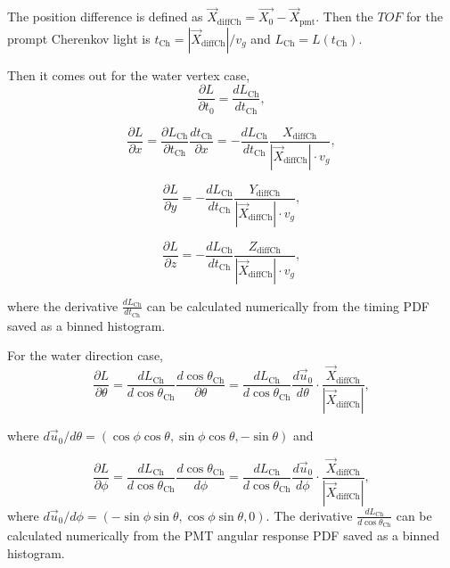 The position difference is defined as $\vec{X}_{{\mathrm{diffCh}}} = \vec{X_0}-\vec{X}_{\mathrm{pmt}}$. Then the $TOF$ for the prompt Cherenkov light is $t_{\mathrm{Ch}}=|\vec{X}_{{\mathrm{diffCh}}}|/v_g$ and $L_{\mathrm{Ch}}=L(t_{\mathrm{Ch}})$.

Then it comes out for the water vertex case,
\begin{equation}
\frac{\partial L}{\partial t_0}=\frac{dL_{\mathrm{Ch}}}{dt_{\mathrm{Ch}}},
\end{equation}

\begin{equation}
\frac{\partial L}{\partial x}=\frac{\partial L_{\mathrm{Ch}}}{\partial t_{\mathrm{Ch}}}\frac{dt_{\mathrm{Ch}}}{\partial x}=-\frac{dL_{\mathrm{Ch}}}{dt_{\mathrm{Ch}}}\frac{X_{{\mathrm{diffCh}}}}{|\vec{X}_{{\mathrm{diffCh}}}|\cdot v_g},
\end{equation}

\begin{equation}
\frac{\partial L}{\partial y}=-\frac{dL_{\mathrm{Ch}}}{dt_{\mathrm{Ch}}}\frac{Y_{{\mathrm{diffCh}}}}{|\vec{X}_{{\mathrm{diffCh}}}|\cdot v_g},
\end{equation}

\begin{equation}
\frac{\partial L}{\partial z}=-\frac{dL_{\mathrm{Ch}}}{dt_{\mathrm{Ch}}}\frac{Z_{{\mathrm{diffCh}}}}{|\vec{X}_{{\mathrm{diffCh}}}|\cdot v_g},
\end{equation}

where the derivative $\frac{dL_{\mathrm{Ch}}}{dt_{\mathrm{Ch}}}$ can be calculated numerically from the timing PDF saved as a binned histogram.

For the water direction case,
\begin{equation}
\frac{\partial L}{\partial\theta}=\frac{dL_{\mathrm{Ch}}}{d\cos\theta_{\mathrm{Ch}}}\frac{d\cos\theta_{\mathrm{Ch}}}{\partial\theta}
=\frac{dL_{\mathrm{Ch}}}{d\cos\theta_{\mathrm{Ch}}}\frac{d\vec{u}_0}{d\theta}\cdot\frac{\vec{X}_{{\mathrm{diffCh}}}}{|\vec{X}_{{\mathrm{diffCh}}}|},
\end{equation}

where $d\vec{u}_0/d\theta=(\cos\phi\cos\theta, \sin\phi\cos\theta, -\sin\theta)$ and 

\begin{equation}
\frac{\partial L}{\partial\phi}=\frac{dL_{\mathrm{Ch}}}{d\cos\theta_{\mathrm{Ch}}}\frac{d\cos\theta_{\mathrm{Ch}}}{d\phi}
=\frac{dL_{\mathrm{Ch}}}{d\cos\theta_{\mathrm{Ch}}}\frac{d\vec{u}_0}{d\phi}\cdot\frac{\vec{X}_{{\mathrm{diffCh}}}}{|\vec{X}_{{\mathrm{diffCh}}}|},
\end{equation} 
where $d\vec{u}_0/d\phi=(-\sin\phi\sin\theta, \cos\phi\sin\theta, 0)$. The derivative $\frac{dL_{\mathrm{Ch}}}{d\cos\theta_{\mathrm{Ch}}}$ can be calculated numerically from the PMT angular response PDF saved as a binned histogram.

